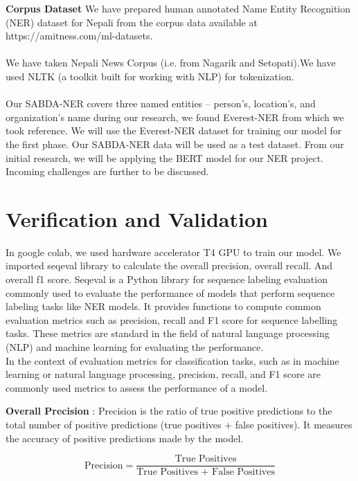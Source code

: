 \textbf{Corpus Dataset} We have prepared human annotated Name Entity Recognition (NER) dataset for Nepali from the corpus data available at https://amitness.com/ml-datasets.\\
\\
We have taken Nepali News Corpus (i.e. from Nagarik and Setopati).We have used NLTK (a toolkit built for working with NLP) for tokenization.\\
\\
Our SABDA-NER covers three named entities – person’s, location's, and organization’s name during our research, we found Everest-NER from which we took reference. We will use the Everest-NER dataset for training our model for the first phase. Our SABDA-NER data will be used as a test dataset. From our initial research, we will be applying the BERT model for our NER project. Incoming challenges are further to be discussed.\cite{2}


\newpage
\textbf{}\section{Verification and Validation}
\vspace{10pt}
In google colab, we used hardware accelerator T4 GPU to train our model.
We imported seqeval library to calculate the overall precision, overall recall. And overall f1 score. 
Seqeval is a Python library for sequence labeling evaluation commonly used to evaluate the performance of models that perform sequence labeling tasks like NER models.
It provides functions to compute common evaluation metrics such as precision, recall and F1 score for sequence labelling tasks.
These metrics are standard in the field of natural language processing (NLP) and machine learning for evaluating the performance.\\

In the context of evaluation metrics for classification tasks, such as in machine learning or natural language processing, precision, recall, and F1 score are commonly used metrics to assess the performance of a model.

\textbf{Overall Precision} :
   Precision is the ratio of true positive predictions to the total number of positive predictions (true positives + false positives). It measures the accuracy of positive predictions made by the model.
    

    \begin{equation}
\text{Precision} = \frac{\text{True Positives}}{\text{True Positives + False Positives}}
\end{equation}


